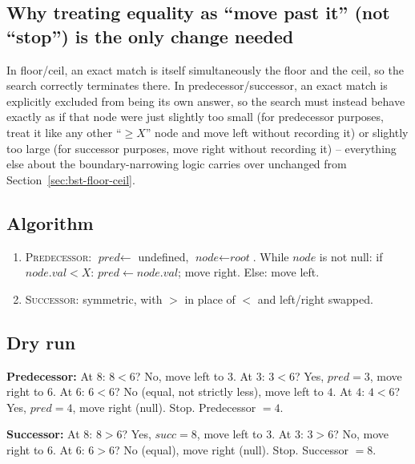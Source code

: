\subsection*{Why treating equality as ``move past it'' (not ``stop'') is the only change needed}

In floor/ceil, an exact match is itself simultaneously the floor and the
ceil, so the search correctly terminates there. In predecessor/successor,
an exact match is explicitly excluded from being its own answer, so the
search must instead behave exactly as if that node were just slightly
too small (for predecessor purposes, treat it like any other ``$\ge X$''
node and move left without recording it) or slightly too large (for
successor purposes, move right without recording it) -- everything else
about the boundary-narrowing logic carries over unchanged from
Section~\ref{sec:bst-floor-ceil}.

\subsection*{Algorithm}

\begin{enumerate}
  \item \textsc{Predecessor}: $\textit{pred} \gets$ undefined,
        $\textit{node} \gets \textit{root}$. While $\textit{node}$ is
        not null: if $\textit{node}.\textit{val} < X$:
        $\textit{pred} \gets \textit{node}.\textit{val}$; move right.
        Else: move left.
  \item \textsc{Successor}: symmetric, with $>$ in place of $<$ and
        left/right swapped.
\end{enumerate}

\subsection*{Dry run}


\textbf{Predecessor:} At $8$: $8<6$? No, move left to $3$. At $3$:
$3<6$? Yes, $\textit{pred}=3$, move right to $6$. At $6$: $6<6$? No
(equal, not strictly less), move left to $4$. At $4$: $4<6$? Yes,
$\textit{pred}=4$, move right (null). Stop. Predecessor $=4$.

\textbf{Successor:} At $8$: $8>6$? Yes, $\textit{succ}=8$, move left to
$3$. At $3$: $3>6$? No, move right to $6$. At $6$: $6>6$? No (equal),
move right (null). Stop. Successor $=8$.

